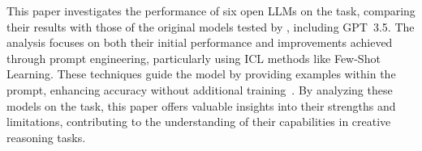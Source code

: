 This paper investigates the performance of six open \acp{LLM} on the  task, comparing their results with those of the original models tested by \textcite{jiangBRAINTEASERLateralThinking2023}, including \acs{GPT}~3.5. The analysis focuses on both their initial performance and improvements achieved through prompt engineering, particularly using \ac{ICL} methods like Few-Shot Learning. These techniques guide the model by providing examples within the prompt, enhancing accuracy without additional training~\cite{yinDeeperInsightsUpdates2024,brownLanguageModelsAre2020}. By analyzing these models on the  task, this paper offers valuable insights into their strengths and limitations, contributing to the understanding of their capabilities in creative reasoning tasks.
